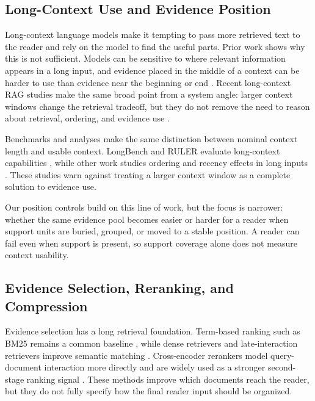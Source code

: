 \documentclass[a4paper,fleqn]{cas-sc}
\begin{document}
\subsection{Long-Context Use and Evidence Position}

Long-context language models make it tempting to pass more retrieved text to
the reader and rely on the model to find the useful parts. Prior work shows why
this is not sufficient. Models can be sensitive to where relevant information
appears in a long input, and evidence placed in the middle of a context can be
harder to use than evidence near the beginning or end \citep{liu2023lost}.
Recent long-context RAG studies make the same broad point from a system angle:
larger context windows change the retrieval tradeoff, but they do not remove
the need to reason about retrieval, ordering, and evidence use
\citep{leng2024longcontextrag,lee2024loft}.

Benchmarks and analyses make the same distinction between nominal context
length and usable context. LongBench and RULER evaluate long-context
capabilities \citep{bai2024longbench,hsieh2024ruler}, while other work studies
ordering and recency effects in long inputs
\citep{peysakhovich2023attentionsorting}. These studies warn against treating a
larger context window as a complete solution to evidence use.

Our position controls build on this line of work, but the focus is narrower:
whether the same evidence pool becomes easier or harder for a reader when
support units are buried, grouped, or moved to a stable position. A reader can
fail even when support is present, so support coverage alone does not measure
context usability.

\subsection{Evidence Selection, Reranking, and Compression}

Evidence selection has a long retrieval foundation. Term-based ranking such as
BM25 remains a common baseline \citep{robertson2009bm25}, while dense retrievers
and late-interaction retrievers improve semantic matching
\citep{karpukhin2020dpr,khattab2020colbert}. Cross-encoder rerankers model
query-document interaction more directly and are widely used as a stronger
second-stage ranking signal \citep{nogueira2019bert}. These methods improve
which documents reach the reader, but they do not fully specify how the final
reader input should be organized.
\end{document}
